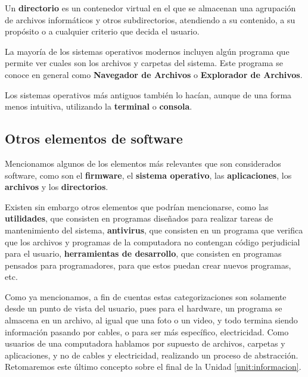 \begin{definition} Un \textbf{directorio} es un contenedor
    virtual en el que se almacenan una agrupación de archivos informáticos y
    otros subdirectorios, atendiendo a su contenido, a su propósito o a
    cualquier criterio que decida el usuario.
    \autocite[part. IV]{gookin_2005}
\end{definition}

\begin{knowwhat} La mayoría de los sistemas
operativos modernos incluyen algún programa que permite ver cuales son los
archivos y carpetas del sistema. Este programa se conoce en general como
\textbf{Navegador de Archivos} o \textbf{Explorador de Archivos}.

Los sistemas operativos más antiguos también lo hacían, aunque de una forma
menos intuitiva, utilizando la \textbf{terminal} o \textbf{consola}.
\end{knowwhat}

\subsection{Otros elementos de software}
\label{chap:computadoras:subsec:otro_software}

Mencionamos algunos de los elementos más relevantes que son considerados
software, como son el \textbf{firmware}, el \textbf{sistema operativo}, las
\textbf{aplicaciones}, los \textbf{archivos} y los \textbf{directorios}.

Existen sin embargo otros elementos que podrían mencionarse, como las
\textbf{utilidades}, que consisten en programas diseñados para realizar tareas
de mantenimiento del sistema, \textbf{antivirus}, que consisten en un programa
que verifica que los archivos y programas de la computadora no contengan código
perjudicial para el usuario, \textbf{herramientas de desarrollo}, que consisten
en programas pensados para programadores, para que estos puedan crear nuevos
programas, etc.

Como ya mencionamos, a fin de cuentas estas categorizaciones son solamente desde
un punto de vista del usuario, pues para el hardware, un programa se almacena en
un archivo, al igual que una foto o un video, y todo termina siendo información
pasando por cables, o para ser más específico, electricidad. Como usuarios de
una computadora hablamos por supuesto de archivos, carpetas y aplicaciones, y no
de cables y electricidad, realizando un proceso de abstracción. Retomaremos este
último concepto sobre el final de la Unidad \ref{unit:informacion}.

